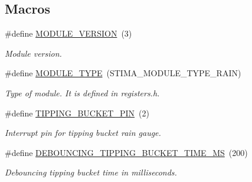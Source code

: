 \subsection*{Macros}
\begin{DoxyCompactItemize}
\item 
\mbox{\label{i2c-rain-config_8h_aa8639a8d4e83d9cc4187d7a751228464}} 
\#define \hyperlink{i2c-rain-config_8h_aa8639a8d4e83d9cc4187d7a751228464}{M\+O\+D\+U\+L\+E\+\_\+\+V\+E\+R\+S\+I\+ON}~(3)
\begin{DoxyCompactList}\small\item\em Module version. \end{DoxyCompactList}\item 
\mbox{\label{i2c-rain-config_8h_a8c815d03b3fd3e18ca06f920a1eb4e8e}} 
\#define \hyperlink{i2c-rain-config_8h_a8c815d03b3fd3e18ca06f920a1eb4e8e}{M\+O\+D\+U\+L\+E\+\_\+\+T\+Y\+PE}~(S\+T\+I\+M\+A\+\_\+\+M\+O\+D\+U\+L\+E\+\_\+\+T\+Y\+P\+E\+\_\+\+R\+A\+IN)
\begin{DoxyCompactList}\small\item\em Type of module. It is defined in registers.\+h. \end{DoxyCompactList}\item 
\mbox{\label{i2c-rain-config_8h_a1023d789b828a59d3d22b2c1dddf5702}} 
\#define \hyperlink{i2c-rain-config_8h_a1023d789b828a59d3d22b2c1dddf5702}{T\+I\+P\+P\+I\+N\+G\+\_\+\+B\+U\+C\+K\+E\+T\+\_\+\+P\+IN}~(2)
\begin{DoxyCompactList}\small\item\em Interrupt pin for tipping bucket rain gauge. \end{DoxyCompactList}\item 
\mbox{\label{i2c-rain-config_8h_a96fb36600c0cea5d22644c26e2d1c7e8}} 
\#define \hyperlink{i2c-rain-config_8h_a96fb36600c0cea5d22644c26e2d1c7e8}{D\+E\+B\+O\+U\+N\+C\+I\+N\+G\+\_\+\+T\+I\+P\+P\+I\+N\+G\+\_\+\+B\+U\+C\+K\+E\+T\+\_\+\+T\+I\+M\+E\+\_\+\+MS}~(200)
\begin{DoxyCompactList}\small\item\em Debouncing tipping bucket time in milliseconds. \end{DoxyCompactList}\item 
\mbox{\label{i2c-rain-config_8h_a5c4024778a87026713c77babd50c06e8}} 

\end{DoxyCompactItemize}
